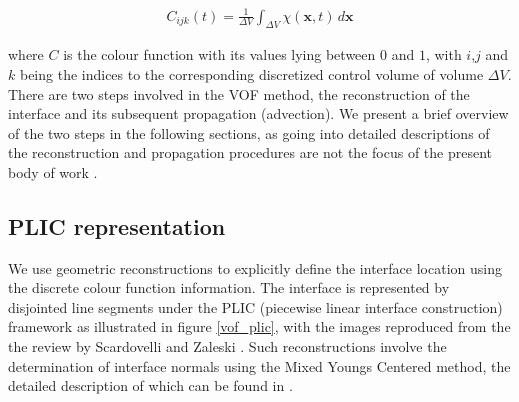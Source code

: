 \begin{align} 
	C_{ijk}\left(t\right) = \frac{1}{\Delta V} \displaystyle\int_{\Delta V} \chi(\boldsymbol{x},t) \,d\boldsymbol x 
\end{align}

where $C$ is the colour function with its values lying between $0$ and $1$, 
with $i$,$j$ and $k$ being the indices to the corresponding discretized control volume of volume $\Delta V$.  
There are two steps involved in the VOF method, the reconstruction of the interface and its 
subsequent propagation (advection). We present a brief overview of the two steps in the following sections,
as going into detailed descriptions of the reconstruction and propagation procedures are 
not the focus of the present body of work .  


\subsection*{PLIC representation}
We use geometric reconstructions to explicitly define the 
interface location using the discrete colour function information. 
The interface is represented by disjointed line segments under 
the PLIC (piecewise linear interface construction)
framework as illustrated in figure \ref{vof_plic}, with the images reproduced 
from the the review by Scardovelli and Zaleski . 
Such reconstructions involve the determination of interface normals 
using the Mixed Youngs Centered method, the detailed description 
of which can be found in \cite{zaleskibook}. 

